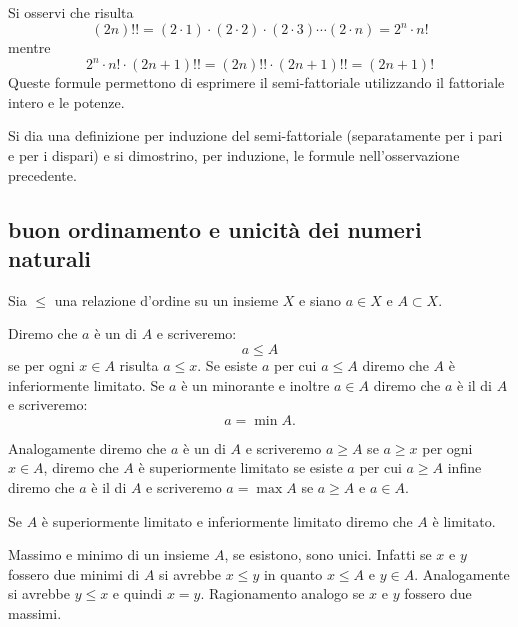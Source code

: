   \begin{remark}
  \label{rem:doppio_fattoriale}%
  Si osservi che risulta
  \[
    (2n)!! = (2\cdot 1) \cdot (2\cdot 2) \cdot (2\cdot 3) \cdots (2\cdot n)
          = 2^n \cdot n!
  \]
  mentre
  \[
    2^n \cdot n! \cdot (2n+1)!! 
    = (2n)!! \cdot (2n+1)!!
    = (2n+1)!
  \]
  Queste formule permettono di esprimere il semi-fattoriale utilizzando
  il fattoriale intero e le potenze.
  \end{remark}
  
\begin{exercise}
  Si dia una definizione per induzione del semi-fattoriale
  (separatamente per i pari e per i dispari)
  e si dimostrino, per induzione, le formule nell'osservazione precedente.
\end{exercise}

\subsection{buon ordinamento e unicità dei numeri naturali}

\begin{definition}
  \label{def:minorante}%
  \label{def:minimo}%
  \label{def:limitato}%
  Sia $\le$ una relazione d'ordine su un insieme $X$ e siano 
  $a\in X$ e $A\subset X$.

  Diremo che $a$ è un  di $A$ e scriveremo:
  \[
    a \le A
  \]
  se per ogni $x\in A$ risulta $a\le x$. 
  Se esiste $a$ per cui $a\le A$ diremo che $A$ 
  è inferiormente limitato.
  Se $a$ è un minorante e inoltre $a\in A$ diremo 
  che $a$ è il  di $A$ e scriveremo:
  \[
    a = \min A.  
  \] 

  Analogamente diremo che $a$ è un 
  di $A$ e scriveremo $a \ge A$ se $a\ge x$ per ogni $x\in A$,
  diremo che $A$ è superiormente limitato 
  se esiste $a$ per cui $a \ge A$ infine
  diremo che $a$ è il  di $A$ 
  e scriveremo $a=\max A$ se $a\ge A$ e $a\in A$.

  Se $A$ è superiormente limitato e inferiormente limitato
  diremo che $A$ è limitato.
\end{definition}

Massimo e minimo di un insieme $A$, se esistono, sono unici.
Infatti se $x$ e $y$ fossero due minimi di $A$ si avrebbe $x\le y$ in
quanto $x\le A$ e $y\in A$. Analogamente si avrebbe $y\le x$ e
quindi $x=y$. Ragionamento analogo se $x$ e $y$ fossero due massimi.

